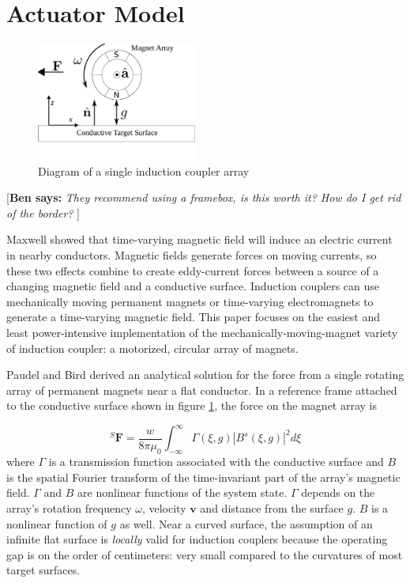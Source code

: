 \documentclass[letterpaper, 10 pt, conference]{ieeeconf}  %
\newcommand{\ben}[1]{{\color{red}\small\par {[{\bf Ben says:} {\em #1}} ] \\    }}
\begin{document}
%
\section{Actuator Model}
\label{sec:model}
 \begin{figure}[thpb]
      \centering
      \includegraphics[width = 0.47\textwidth]{figures/spin_mag_diagram.pdf}
      \caption{Diagram of a single induction coupler array}
      \label{fig:single_array}
   \end{figure}
\ben{They recommend using a framebox, is this worth it? How do I get rid of the border?}   
\par Maxwell showed that time-varying magnetic field will induce an electric current in nearby conductors. Magnetic fields generate forces on moving currents, so these two effects combine to create eddy-current forces between a source of a changing magnetic field and a conductive surface. Induction couplers can use mechanically moving permanent magnets or time-varying electromagnets to generate a time-varying magnetic field. This paper focuses on the easiest and least power-intensive implementation of the mechanically-moving-magnet variety of induction coupler: a motorized, circular array of magnets. 
%
\par Paudel and Bird derived an analytical solution for the force from a single rotating array of permanent magnets near a flat conductor. \cite{Paudel2013} In a reference frame attached to the conductive surface shown in figure \ref{fig:single_array}, the force on the magnet array is

\begin{equation}
\label{eq:Paudel55}
{}^S\textbf{F} = \frac{w}{8\pi\mu_0} \int^{\infty}_{-\infty}\Gamma(\xi,g)|B^s(\xi,g)|^2 d\xi
\end{equation}
where $\Gamma$ is a transmission function associated with the conductive surface and $B$ is the spatial Fourier transform of the time-invariant part of the array's magnetic field.
$\Gamma$ and $B$ are nonlinear functions of the system state. $\Gamma$ depends on the array's rotation frequency $\omega$, velocity $\textbf{v}$ and distance from the surface $g$. $B$ is a nonlinear function of $g$ as well. Near a curved surface, the assumption of an infinite flat surface is \textit{locally} valid for induction couplers because the operating gap is on the order of centimeters: very small compared to the curvatures of most target surfaces. 
 
\end{document}
